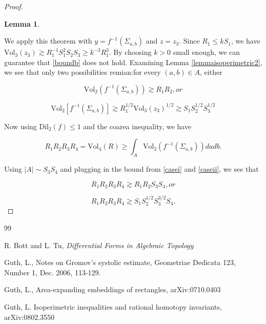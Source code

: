 \documentclass{amsart}
\newtheorem*{theorem 1}{Theorem 1}
\newtheorem*{theorem 2}{Theorem 2}
\newtheorem*{theorem 3}{Theorem 3}
\newtheorem{lemma}{Lemma}[section]
\numberwithin{equation}{section}
\newcommand{\Dil}{\textrm{Dil}}
\newcommand{\Vol}{\textrm{Vol}}
\begin{document}
\begin{proof}
\begin{lemma}
\end{lemma}

We apply this theorem with $y = f^{-1}(\Sigma_{a,b})$ and $z = z_3$.   Since $R_1 \le k S_1$,  we have $\Vol_3(z_3) \gtrsim R_1^{-1} S_1^2 S_2 S_3 \ge k^{-3} R_1^3$.   By choosing $k > 0$ small enough,  we can guarantee that \eqref{boundb} does not hold.   Examining Lemma \ref{lemmaisoperimetric2},  we see that only two possibilities remian:for every $(a,b) \in A$,  either

\begin{equation} \label{casei} \Vol_2(f^{-1}(\Sigma_{a,b})) \gtrsim R_1 R_2,  or \end{equation}

\begin{equation} \label{caseii} \Vol_2[f^{-1}(\Sigma_{a,b})] \gtrsim R_1^{1/2} \Vol_3(z_3)^{1/2} \gtrsim S_1 S_2^{1/2} S_3^{1/2} \end{equation}

Now using $\Dil_2(f) \le 1$ and the coarea inequality,  we have

$$ R_1 R_2 R_3 R_4 = \Vol_4 (R) \ge \int_{A} \Vol_2(f^{-1}(\Sigma_{a,b})) da db. $$

Using $|A| \sim S_3 S_4$ and plugging in the bound from \eqref{casei} and \eqref{caseii},  we see that

$$ R_1 R_2 R_3 R_4 \gtrsim R_1 R_2 S_3 S_4,  or $$

$$ R_1 R_2 R_3 R_4 \gtrsim S_1 S_2^{1/2} S_3^{3/2} S_4. $$


\end{proof}




\begin{thebibliography}{99}

 R. Bott and L. Tu,  {\it Differential Forms in Algebraic Topology}

 Guth, L., Notes on Gromov's systolic estimate,
Geometriae Dedicata 123, Number 1, Dec. 2006, 113-129.

 Guth, L., Area-expanding embeddings of rectangles, arXiv:0710.0403 

 Guth, L.  Isoperimetric inequalities and rational homotopy invariants, arXiv:0802.3550 


\end{thebibliography}
\end{document}
